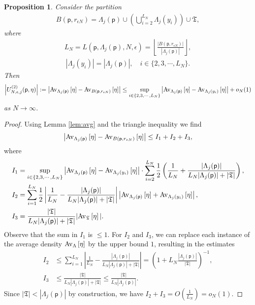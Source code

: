 \documentclass[11pt]{amsart}
\theoremstyle{plain}
\newtheorem{proposition}[lemma]{Proposition}
\theoremstyle{definition}
\theoremstyle{remark}
\newcommand{\pt}{\mathsf{p}}
\newcommand{\Utwo}[3]{U^{(2)}_{{#1},{#2},{#3}}}
\newcommand{\avg}[2]{{\rm Av}_{#2}\left[{#1}\right]}
\begin{document}
\begin{proposition}
\label{prop:goodavg}
Consider the partition
\begin{align*}
B(\pt,r_{\epsilon N}) = \Lambda_j(\pt) \cup \left(\bigcup_{i=2}^{L_N} \Lambda_j(y_i) \right) \cup \mathfrak{T},
\end{align*}
where
\begin{align*}
L_N = L(\pt,\Lambda_j(\pt), N, \epsilon) = \left\lfloor \frac{|B(\pt,r_{\epsilon N})|}{|\Lambda_j(\pt)|} \right\rfloor,
\end{align*}
\begin{align*}
|\Lambda_j(y_i)| = |\Lambda_j(\pt)|, \quad i\in\{2,3,\cdots, L_N\}.
\end{align*}
Then
\begin{align*}
\left|\Utwo{N}{\epsilon}{j}(\pt,\eta)\right|:=\left|\avg{\eta}{\Lambda_j(\pt)} - \avg{\eta}{B(\pt, r_{\epsilon N})}\right| \leq \sup_{i\in \{2,3,\cdots, L_N\}} \left|\avg{\eta}{\Lambda_j(\pt)} - \avg{\eta}{\Lambda_j(y_i)}\right| + o_N(1)
\end{align*}
as $N\to\infty$.
\end{proposition}

\begin{proof}
Using Lemma \ref{lem:avg} and the triangle inequality we find
\begin{align*}
\left|\avg{\eta}{\Lambda_j(\pt)} - \avg{\eta}{B(\pt, r_{\epsilon N})}\right| \leq I_1 + I_2 + I_3,
\end{align*}
where
\begin{align*}
I_1 &= \sup_{i\in \{2,3,\cdots, L_N\}} \left| \avg{\eta}{\Lambda_j(\pt)} - \avg{\eta}{\Lambda_j(y_i)}\right| \cdot \sum_{i=2}^{L_N} \frac{1}{2} \left(\frac{1}{L_N} + \frac{|\Lambda_j(\pt)|}{L_N |\Lambda_j(\pt)| + |\mathfrak{T}|} \right),\\
I_2 &= \sum_{i=1}^{L_N} \frac{1}{2} \left|\frac{1}{L_N} - \frac{|\Lambda_j(\pt)|}{L_N|\Lambda_j(\pt)| + |\mathfrak{T}|} \right| \left|\avg{\eta}{\Lambda_j(\pt)} + \avg{\eta}{\Lambda_j(y_i)}\right|,\\
I_3 &= \frac{|\mathfrak{T}|}{L_N |\Lambda_j(\pt)| + |\mathfrak{T}|} |\avg{\eta}{\mathfrak{T}}|.
\end{align*}
Observe that the sum in $I_1$ is $\leq 1$. For $I_2$ and $I_3$, we can replace each instance of the average density $\avg{\eta}{\Lambda}$ by the upper bound $1$, resulting in the estimates
\begin{align*}
I_2 &\leq \sum_{i=1}^{L_N} \left|\frac{1}{L_N} - \frac{|\Lambda_j(\pt)|}{L_N|\Lambda_j(\pt)|+|\mathfrak{T}|}\right| = \left( 1+ L_N\frac{|\Lambda_j(\pt)|}{|\mathfrak{T}|}\right)^{-1}, \\
I_3 &\leq \frac{|\mathfrak{T}|}{L_N |\Lambda_j(\pt)|+ |\mathfrak{T}|} \leq \frac{|\mathfrak{T}|}{L_N |\Lambda_j(\pt)|}. 
\end{align*}
Since $|\mathfrak{T}| < |\Lambda_j(\pt)|$ by construction, we have $I_2 + I_3 = O\left(\frac{1}{L_N}\right)= o_N(1)$.
\end{proof}
\end{document}
